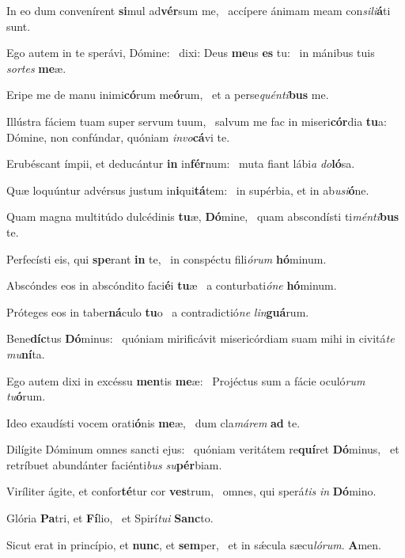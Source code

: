 \item In eo dum convenírent \textbf{si}mul ad\textbf{vér}sum me,~\psstar{} accípere ánimam meam con\textit{sili}\textbf{á}ti sunt.
\item Ego autem in te sperávi, Dómine:~\pscross{} dixi: Deus \textbf{me}us \textbf{es} tu:~\psstar{} in mánibus tuis \textit{sortes} \textbf{me}æ.
\item Eripe me de manu inimi\textbf{có}rum me\textbf{ó}rum,~\psstar{} et a perse\textit{quénti}\textbf{bus} me.
\item Illústra fáciem tuam super servum tuum,~\pscross{} salvum me fac in miseri\textbf{cór}dia \textbf{tu}a:~\psstar{} Dómine, non confúndar, quóniam \textit{invo}\textbf{cá}vi te.
\item Erubéscant ímpii, et deducántur \textbf{in} in\textbf{fér}num:~\psstar{} muta fiant lábi\textit{a} \textit{do}\textbf{ló}sa.
\item Quæ loquúntur advérsus justum in\textbf{i}qui\textbf{tá}tem:~\psstar{} in supérbia, et in ab\textit{usi}\textbf{ó}ne.
\item Quam magna multitúdo dulcédinis \textbf{tu}æ, \textbf{Dó}mine,~\psstar{} quam abscondísti ti\textit{ménti}\textbf{bus} te.
\item Perfecísti eis, qui \textbf{spe}rant \textbf{in} te,~\psstar{} in conspéctu fili\textit{órum} \textbf{hó}minum.
\item Abscóndes eos in abscóndito faci\textbf{é}i \textbf{tu}æ~\psstar{} a conturbati\textit{óne} \textbf{hó}minum.
\item Próteges eos in taber\textbf{ná}culo \textbf{tu}o~\psstar{} a contradictió\textit{ne} \textit{lin}\textbf{guá}rum.
\item Bene\textbf{díc}tus \textbf{Dó}minus:~\psstar{} quóniam mirificávit misericórdiam suam mihi in civitá\textit{te} \textit{mu}\textbf{ní}ta.
\item Ego autem dixi in excéssu \textbf{men}tis \textbf{me}æ:~\psstar{} Projéctus sum a fácie oculó\textit{rum} \textit{tu}\textbf{ó}rum.
\item Ideo exaudísti vocem orati\textbf{ó}nis \textbf{me}æ,~\psstar{} dum cla\textit{márem} \textbf{ad} te.
\item Dilígite Dóminum omnes sancti ejus:~\pscross{} quóniam veritátem re\textbf{quí}ret \textbf{Dó}minus,~\psstar{} et retríbuet abundánter faciénti\textit{bus} \textit{su}\textbf{pér}biam.
\item Viríliter ágite, et confor\textbf{té}tur cor \textbf{ves}trum,~\psstar{} omnes, qui sperá\textit{tis} \textit{in} \textbf{Dó}mino.
\item Glória \textbf{Pa}tri, et \textbf{Fí}lio,~\psstar{} et Spirí\textit{tui} \textbf{Sanc}to.
\item Sicut erat in princípio, et \textbf{nunc}, et \textbf{sem}per,~\psstar{} et in sǽcula sæcu\textit{lórum}. \textbf{A}men.
